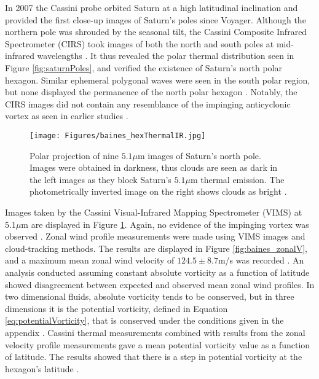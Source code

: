 \documentclass[preprint]{revtex4-1} %
\begin{document}
In 2007 the Cassini probe orbited Saturn at a high latitudinal
inclination and provided the first close-up images of Saturn's poles
since Voyager.  Although the northern pole was shrouded by the
seasonal tilt, the Cassini Composite Infrared Spectrometer (CIRS) took
images of both the north and south poles at mid-infrared
wavelengths \cite{Fletcher2008}.  It thus revealed the polar thermal
distribution seen in Figure \ref{fig:saturnPoles}, and verified the
existence of Saturn's north polar hexagon.  Similar ephemeral
polygonal waves were seen in the south polar region, but none
displayed the permanence of the north polar hexagon
\cite{Fletcher2008}.  Notably, the CIRS images did not contain any resemblance of
the impinging anticyclonic vortex as seen in earlier studies
\cite{Fletcher2008}.

\begin{figure}
  \centering
  \texttt{[image: Figures/baines\_hexThermalIR.jpg]}
  \caption{Polar projection of nine $5.1\mu$m images of Saturn's north
    pole.  Images were obtained in darkness, thus clouds are seen as
    dark in the left images as they block Saturn's $5.1\mu$m thermal
    emission.  The photometrically inverted image on the right shows
    clouds as bright \cite[fig~1]{Baines2009}.} 
  \label{fig:vimsClouds}
\end{figure}

Images taken by the Cassini Visual-Infrared Mapping Spectrometer
(VIMS) at $5.1\mu$m are displayed in Figure \ref{fig:vimsClouds}.
Again, no evidence of the impinging vortex was observed
\cite{Baines2009}.  Zonal wind profile
measurements were made using VIMS images and cloud-tracking methods.
The results are displayed in Figure \ref{fig:baines_zonalV}, and a
maximum mean zonal wind velocity of $124.5 \pm 8.7$m/s was recorded
\cite{Baines2009}.  An analysis conducted assuming constant absolute
vorticity as a function of latitude showed disagreement between
expected and observed mean zonal wind profiles.  In two dimensional
fluids, absolute vorticity tends to be conserved, but in three
dimensions it is the potential vorticity, defined in Equation
\ref{eq:potentialVorticity}, that is conserved under the conditions
given in the appendix \cite{Pedlosky87}.  Cassini
thermal measurements combined with results from the zonal velocity
profile measurements gave a mean potential vorticity value as a
function of latitude.  The results showed that there is a step in
potential vorticity at the hexagon's latitude \cite{Baines2009}.
\end{document}
